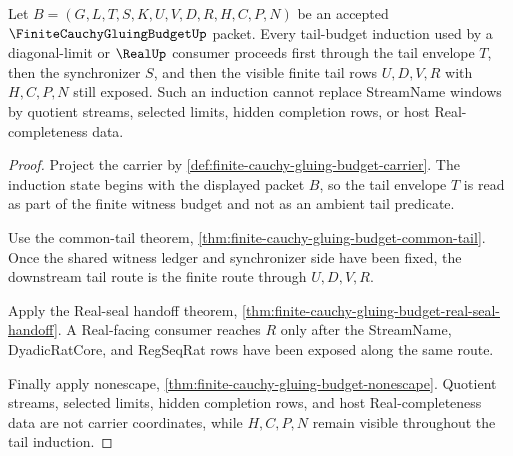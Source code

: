 \begin{theorem}
\label{thm:finite-cauchy-gluing-budget-tail-stream-induction}
Let $B=(G,L,T,S,K,U,V,D,R,H,C,P,N)$ be an accepted $\FiniteCauchyGluingBudgetUp$ packet. Every tail-budget induction used by a diagonal-limit or $\RealUp$ consumer proceeds first through the tail envelope $T$, then the synchronizer $S$, and then the visible finite tail rows $U,D,V,R$ with $H,C,P,N$ still exposed. Such an induction cannot replace StreamName windows by quotient streams, selected limits, hidden completion rows, or host Real-completeness data.
\end{theorem}
\begin{proof}
Project the carrier by \autoref{def:finite-cauchy-gluing-budget-carrier}. The induction state begins with the displayed packet $B$, so the tail envelope $T$ is read as part of the finite witness budget and not as an ambient tail predicate.

Use the common-tail theorem, \autoref{thm:finite-cauchy-gluing-budget-common-tail}. Once the shared witness ledger and synchronizer side have been fixed, the downstream tail route is the finite route through $U,D,V,R$.

Apply the Real-seal handoff theorem, \autoref{thm:finite-cauchy-gluing-budget-real-seal-handoff}. A Real-facing consumer reaches $R$ only after the StreamName, DyadicRatCore, and RegSeqRat rows have been exposed along the same route.

Finally apply nonescape, \autoref{thm:finite-cauchy-gluing-budget-nonescape}. Quotient streams, selected limits, hidden completion rows, and host Real-completeness data are not carrier coordinates, while $H,C,P,N$ remain visible throughout the tail induction.
\end{proof}

